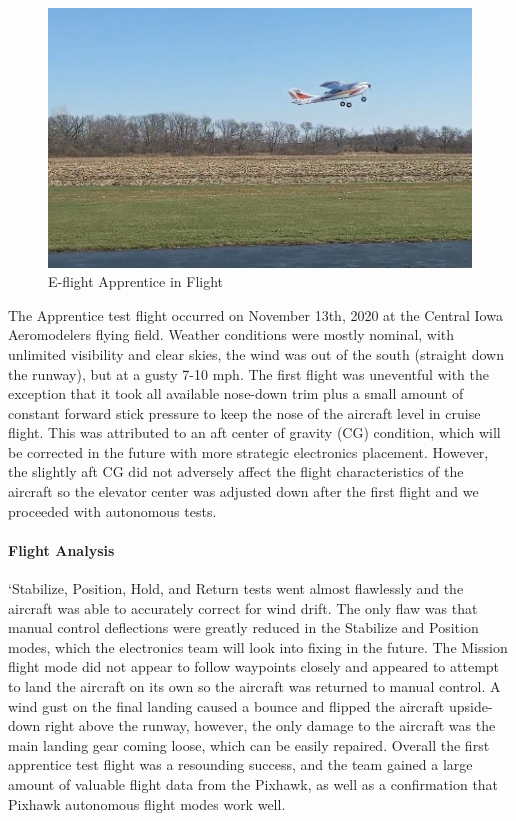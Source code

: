 \documentclass{article}
\begin{document}
\begin{figure}[!h]
    \centering
    \includegraphics[width=0.9\linewidth]{Images/RANGER1.PNG}
    \caption{E-flight Apprentice in Flight}
    \label{fig:Rangertest}
\end{figure}


The Apprentice test flight occurred on November 13th, 2020 at the Central Iowa Aeromodelers flying field. Weather conditions were mostly nominal, with unlimited visibility and clear skies, the wind was out of the south (straight down the runway), but at a gusty 7-10 mph. The first flight was uneventful with the exception that it took all available nose-down trim plus a small amount of constant forward stick pressure to keep the nose of the aircraft level in cruise flight. This was attributed to an aft center of gravity (CG) condition, which will be corrected in the future with more strategic electronics placement. However, the slightly aft CG did not adversely affect the flight characteristics of the aircraft so the elevator center was adjusted down after the first flight and we proceeded with autonomous tests.

\paragraph{Flight Analysis}`Stabilize, Position, Hold, and Return tests went almost flawlessly and the aircraft was able to accurately correct for wind drift. The only flaw was that manual control deflections were greatly reduced in the Stabilize and Position modes, which the electronics team will look into fixing in the future. The Mission flight mode did not appear to follow waypoints closely and appeared to attempt to land the aircraft on its own so the aircraft was returned to manual control. A wind gust on the final landing caused a bounce and flipped the aircraft upside-down right above the runway, however, the only damage to the aircraft was the main landing gear coming loose, which can be easily repaired. Overall the first apprentice test flight was a resounding success, and the team gained a large amount of valuable flight data from the Pixhawk, as well as a confirmation that Pixhawk autonomous flight modes work well.
\end{document}
